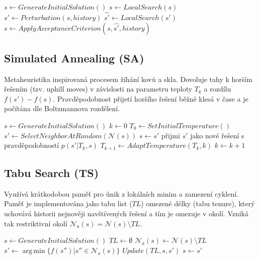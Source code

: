 \documentclass[12pt,a4paper]{article}
\theoremstyle{definition}
\begin{document}
\begin{algorithm}[H]
\caption{Iterated Local Search (ILS) }
\begin{algorithmic}[1]
\STATE $s \gets GenerateInitialSolution()$ 
\STATE $s \gets LocalSearch(s)$ 
\STATE $s' \gets Perturbation(s, history)$ 
\STATE $\hat{s'} \gets LocalSearch(s')$ 
\STATE $s \gets ApplyAcceptanceCriterion(s, \hat{s'}, history)$ 
\ENDWHILE
\end{algorithmic}
\end{algorithm}

\subsection{Simulated Annealing (SA)}
Metaheuristika inspirovaná procesem žíhání kovů a skla. Dovoluje tahy k horším řešením (tzv. uphill moves) v závislosti na parametru teploty $T_k$ a rozdílu $f(s') - f(s)$. Pravděpodobnost přijetí horšího řešení běžně klesá v čase a je počítána dle Boltzmannova rozdělení.

\begin{algorithm}[H]
\caption{Simulated Annealing (SA) }
\begin{algorithmic}[1]
\STATE $s \gets GenerateInitialSolution()$ 
\STATE $k \gets 0$ 
\STATE $T_0 \gets SetInitialTemperature()$ 
\STATE $s' \gets SelectNeighborAtRandom(\mathcal{N}(s))$ 
\STATE $s \gets s'$ 
\ELSE
\STATE přijmi $s'$ jako nové řešení s pravděpodobností $p(s'|T_k, s)$ 
\ENDIF
\STATE $T_{k+1} \gets AdaptTemperature(T_k, k)$ 
\STATE $k \gets k + 1$ 
\ENDWHILE
\end{algorithmic}
\end{algorithm}

\subsection{Tabu Search (TS)}
Využívá krátkodobou paměť pro únik z lokálních minim a zamezení cyklení. Paměť je implementována jako tabu list ($TL$) omezené délky (tabu tenure), který uchovává historii nejnověji navštívených řešení a tím je omezuje v okolí. Vzniká tak restriktivní okolí $\mathcal{N}_a(s) = \mathcal{N}(s) \setminus TL$.

\begin{algorithm}[H]
\caption{Tabu Search (TS) }
\begin{algorithmic}[1]
\STATE $s \gets GenerateInitialSolution()$ 
\STATE $TL \gets \emptyset$ 
\STATE $\mathcal{N}_a(s) \gets \mathcal{N}(s) \setminus TL$ 
\STATE $s' \gets \operatorname{arg\,min} \{f(s'') | s'' \in \mathcal{N}_a(s)\}$ 
\STATE $Update(TL, s, s')$ 
\STATE $s \gets s'$ 
\ENDWHILE
\end{algorithmic}
\end{algorithm}
\end{document}
